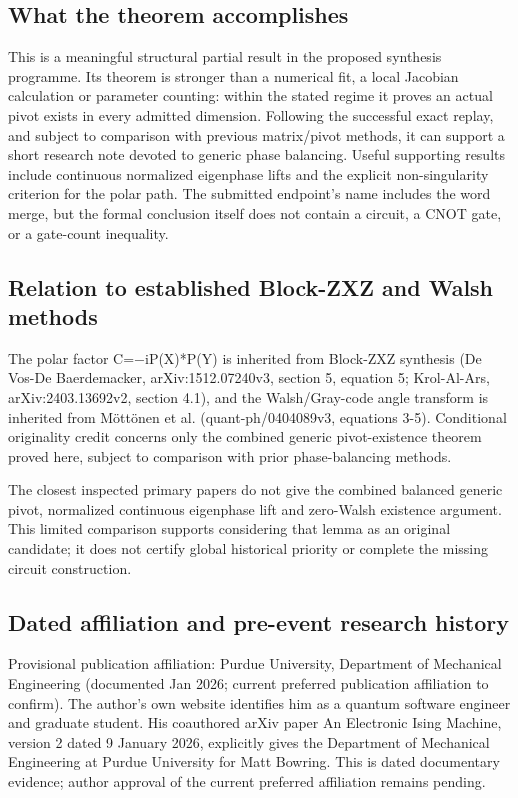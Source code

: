 \documentclass[11pt,a4paper]{article}
\begin{document}
\subsection{What the theorem accomplishes}
This is a meaningful structural partial result in the proposed synthesis programme. Its theorem is stronger than a numerical fit, a local Jacobian calculation or parameter counting: within the stated regime it proves an actual pivot exists in every admitted dimension. Following the successful exact replay, and subject to comparison with previous matrix/pivot methods, it can support a short research note devoted to generic phase balancing. Useful supporting results include continuous normalized eigenphase lifts and the explicit non-singularity criterion for the polar path. The submitted endpoint's name includes the word merge, but the formal conclusion itself does not contain a circuit, a CNOT gate, or a gate-count inequality.

\subsection{Relation to established Block-ZXZ and Walsh methods}
The polar factor C=\ensuremath{-}iP(X)*P(Y) is inherited from Block-ZXZ synthesis (De Vos-De Baerdemacker, arXiv:1512.07240v3, section 5, equation 5; Krol-Al-Ars, arXiv:2403.13692v2, section 4.1), and the Walsh/Gray-code angle transform is inherited from Möttönen et al. (quant-ph/0404089v3, equations 3-5). Conditional originality credit concerns only the combined generic pivot-existence theorem proved here, subject to comparison with prior phase-balancing methods.

The closest inspected primary papers do not give the combined balanced generic pivot, normalized continuous eigenphase lift and zero-Walsh existence argument. This limited comparison supports considering that lemma as an original candidate; it does not certify global historical priority or complete the missing circuit construction.

\subsection{Dated affiliation and pre-event research history}
Provisional publication affiliation: Purdue University, Department of Mechanical Engineering (documented Jan 2026; current preferred publication affiliation to confirm). The author's own website identifies him as a quantum software engineer and graduate student. His coauthored arXiv paper An Electronic Ising Machine, version 2 dated 9 January 2026, explicitly gives the Department of Mechanical Engineering at Purdue University for Matt Bowring. This is dated documentary evidence; author approval of the current preferred affiliation remains pending.
\end{document}
